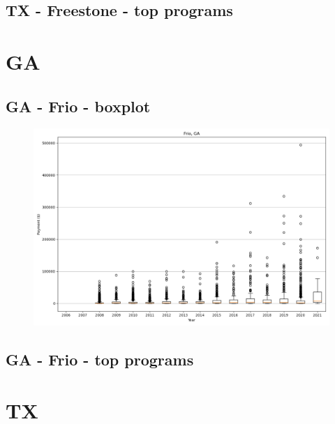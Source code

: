 \subsection*{TX - Freestone - top programs}

\newpage
\section*{GA}
\subsection*{GA - Frio - boxplot}
\begin{figure}[h]
\centering
\includegraphics[width=7in]{../output/boxplots/counties/Frio-GA_boxplot.png}
\end{figure}


\subsection*{GA - Frio - top programs}

\newpage
\section*{TX}
